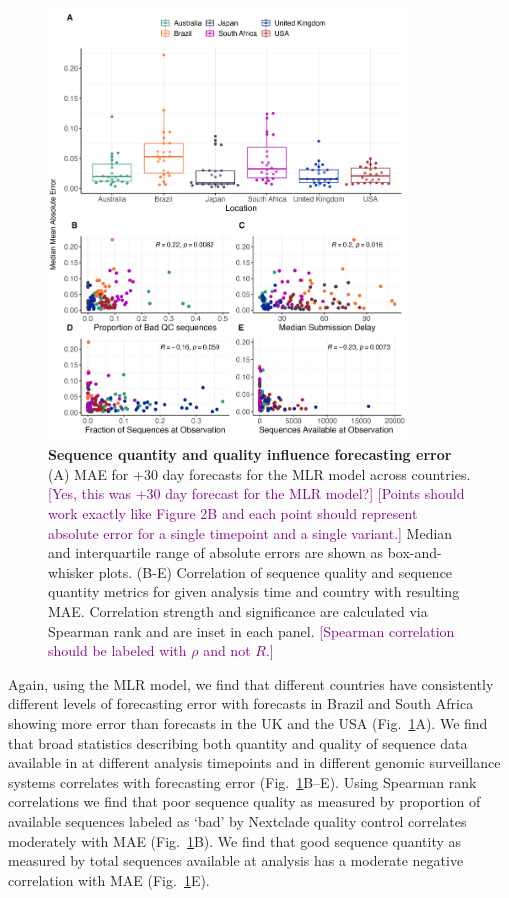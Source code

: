 \documentclass[11pt,oneside,letterpaper]{article}
\def\tbc#1{\textcolor{purple}{[#1]}}
\begin{document}
\begin{figure}[tb!]
	\centering
    \includegraphics[width=0.85\textwidth]{figures/Var_of_interest.png}
	\caption{
		\textbf{Sequence quantity and quality influence forecasting error}
    (A) MAE for +30 day forecasts for the MLR model across countries.
		\tbc{Yes, this was +30 day forecast for the MLR model?}
    \tbc{Points should work exactly like Figure 2B and each point should represent absolute error for a single timepoint and a single variant.}
		Median and interquartile range of absolute errors are shown as box-and-whisker plots.
		(B-E) Correlation of sequence quality and sequence quantity metrics for given analysis time and country with resulting MAE.
    Correlation strength and significance are calculated via Spearman rank and are inset in each panel.
		\tbc{Spearman correlation should be labeled with $\rho$ and not $R$.}
	}
	\label{fig:vars_of_interest}
\end{figure}

Again, using the MLR model, we find that different countries have consistently different levels of forecasting error with forecasts in Brazil and South Africa showing more error than forecasts in the UK and the USA  (Fig.~\ref{fig:vars_of_interest}A).
We find that broad statistics describing both quantity and quality of sequence data available in at different analysis timepoints and in different genomic surveillance systems correlates with forecasting error (Fig.~\ref{fig:vars_of_interest}B--E).
Using Spearman rank correlations we find that poor sequence quality as measured by proportion of available sequences labeled as `bad' by Nextclade quality control \cite{aksamentov2021nextclade} correlates moderately with MAE (Fig.~\ref{fig:vars_of_interest}B).
We find that good sequence quantity as measured by total sequences available at analysis has a moderate negative correlation with MAE (Fig.~\ref{fig:vars_of_interest}E).
\end{document}
